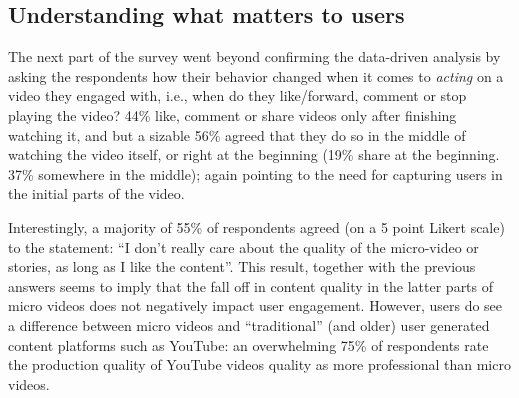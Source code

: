 \subsection{Understanding what matters to users}
The next part of the survey went beyond confirming the data-driven analysis by asking the respondents how their behavior changed when it comes to \emph{acting} on a video they engaged with, i.e., when do they like/forward, comment or stop playing the video? 44\% like, comment or share videos only after finishing watching it, and but a sizable 56\% agreed that they do so in the middle of watching the video itself, or right at the beginning (19\% share at the beginning. 37\% somewhere in the middle); again pointing to the need for capturing users in the initial parts of the video. 

Interestingly, a majority of 55\% of respondents agreed (on a 5 point Likert scale) to the statement: ``I don't really care about the quality of the micro-video or stories, as long as I like the content''. This result, together with the previous answers seems to imply that   the fall off in content quality in the latter parts of micro videos does not negatively impact user engagement. However, users do see a difference between micro videos and ``traditional'' (and older) user generated content platforms such as YouTube: an overwhelming 75\% of respondents rate the production quality of YouTube videos quality as more professional than micro videos.

	